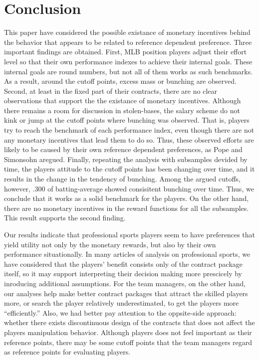 \documentclass[dvipdfmx, 12pt]{article}
\begin{document}





\section{Conclusion}


This paper have considered the possible existance of monetary incentives behind the behavior that appears to be related to reference dependent preference. Three important findings are obtained. First, MLB position players adjust their effort level so that their own performance indexes to achieve their internal goals. These internal goals are round numbers, but not all of them works as such benchmarks. As a result, around the cutoff points, excess mass or bunching are observed. Second, at least in the fixed part of their contracts, there are no clear observations that support the the existance of monetary incentives. Although there remains a room for discussion in stolen-bases, the salary scheme do not kink or jump at the cutoff points where bunching was observed. That is, players try to reach the benchmark of each performance index, even though there are not any monetary incentives that lead them to do so. Thus, these observed efforts are likely to be caused by their own reference dependent preferences, as Pope and Simonsohn aregued. Finally, repeating the analysis with subsamples devided by time, the players attitude to the cutoff points has been changing over time, and it results in the change in the tendency of bunching. Among the argued cutoffs, however, .300 of batting-average showed consisitent bunching over time. Thus, we conclude that it works as a solid benchmark for the players. On the other hand, there are no monetary incentives in the reward functions for all the subsamples. This result supports the second finding.

Our results indicate that professional sports players seem to have preferences that yield utility not only by the monetary rewards, but also by their own performance situationally. In many articles of analysis on professional sports, we have considered that the players' benefit consists only of the contract package itself, so it may support interpreting their decision making more prescicely by inroducing additional assumptions. For the team managers, on the other hand, our analyses help make better contract packages that attract the skilled players more, or search the player relatively underestimated, to get the players more ``efficiently.'' Also, we had better pay attention to the oppsite-side approach: whether there exists discontinuous design of the contracts that does not affect the players manipulation behavior. Although players does not feel important as their reference points, there may be some cutoff points that the team managers regard as reference points for evaluating players.
\end{document}
